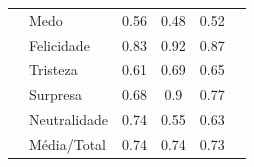 \documentclass{beamer}
\begin{document}
\begin{frame}
\begin{table}[]
\begin{tabular}{llcccc}
                                         & Medo                  & 0.56                                  & 0.48                                   & 0.52                                  &                                       \\
                                         & Felicidade            & 0.83                                  & 0.92                                   & 0.87                                  &                                       \\
                                         & Tristeza              & 0.61                                  & 0.69                                   & 0.65                                  &                                       \\
                                         & Surpresa              & 0.68                                  & 0.9                                    & 0.77                                  &                                       \\
                                         & Neutralidade          & 0.74                                  & 0.55                                   & 0.63                                  &                                       \\
                                         & Média/Total           & 0.74                                  & 0.74                                   & 0.73                                  &                                       \\ \hline
\end{tabular}
\end{table}

\end{frame}



 
 
\end{document}
